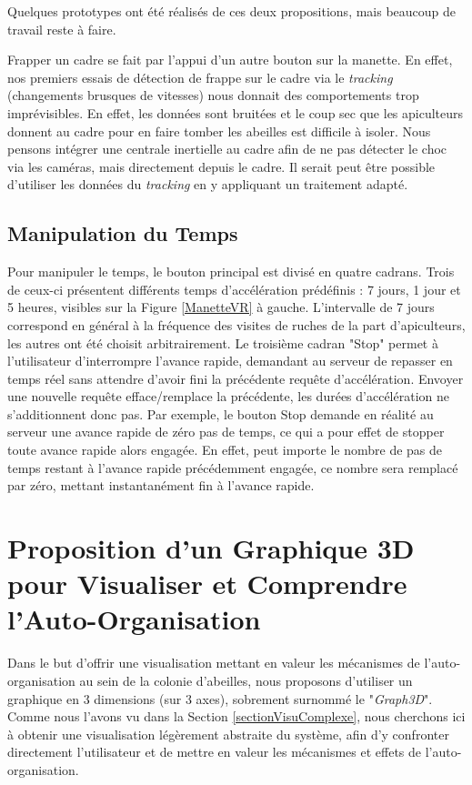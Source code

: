 		Quelques prototypes ont été réalisés de ces deux propositions, mais beaucoup de travail reste à faire.
		
		Frapper un cadre se fait par l'appui d'un autre bouton sur la manette. En effet, nos premiers essais de détection de frappe sur le cadre via le \textit{tracking} (changements brusques de vitesses) nous donnait des comportements trop imprévisibles. En effet, les données sont bruitées et le coup sec que les apiculteurs donnent au cadre pour en faire tomber les abeilles est difficile à isoler. Nous pensons intégrer une centrale inertielle au cadre afin de ne pas détecter le choc via les caméras, mais directement depuis le cadre. Il serait peut être possible d'utiliser les données du \textit{tracking} en y appliquant un traitement adapté.
		
		\subsection{Manipulation du Temps}
		
		Pour manipuler le temps, le bouton principal est divisé en quatre cadrans. Trois de ceux-ci présentent différents temps d'accélération prédéfinis : 7 jours, 1 jour et 5 heures, visibles sur la Figure \ref{ManetteVR} à gauche. L'intervalle de 7 jours correspond en général à la fréquence des visites de ruches de la part d'apiculteurs, les autres ont été choisit arbitrairement. Le troisième cadran "Stop" permet à l'utilisateur d'interrompre l'avance rapide, demandant au serveur de repasser en temps réel sans attendre d'avoir fini la précédente requête d'accélération. Envoyer une nouvelle requête efface/remplace la précédente, les durées d'accélération ne s'additionnent donc pas. Par exemple, le bouton Stop demande en réalité au serveur une avance rapide de zéro pas de temps, ce qui a pour effet de stopper toute avance rapide alors engagée. En effet, peut importe le nombre de pas de temps restant à l'avance rapide précédemment engagée, ce nombre sera remplacé par zéro, mettant instantanément fin à l'avance rapide.
		
	\section{Proposition d'un Graphique 3D pour Visualiser et Comprendre l'Auto-Organisation}
	\label{Manip3D}
		Dans le but d'offrir une visualisation mettant en valeur les mécanismes de l'auto-organisation au sein de la colonie d'abeilles, nous proposons d'utiliser un graphique en 3 dimensions (sur 3 axes), sobrement surnommé le "\textit{Graph3D}". Comme nous l'avons vu dans la Section \ref{sectionVisuComplexe}, nous cherchons ici à obtenir une visualisation légèrement abstraite du système, afin d'y confronter directement l'utilisateur et de mettre en valeur les mécanismes et effets de l'auto-organisation.
		
